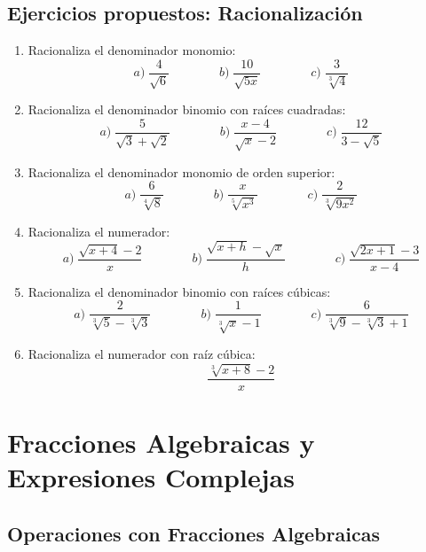 \documentclass[12pt, letterpaper]{article}
\begin{document}
\subsection{Ejercicios propuestos: Racionalización}

\begin{enumerate}[resume=ejercicios, leftmargin=*]
      \item \facil{} Racionaliza el denominador monomio:
            $$a)\; \frac{4}{\sqrt{6}} \qquad\qquad b)\; \frac{10}{\sqrt{5x}} \qquad\qquad c)\; \frac{3}{\sqrt[3]{4}}$$

      \item \medio{} Racionaliza el denominador binomio con raíces cuadradas:
            $$a)\; \frac{5}{\sqrt{3} + \sqrt{2}} \qquad\qquad b)\; \frac{x - 4}{\sqrt{x} - 2} \qquad\qquad c)\; \frac{12}{3 - \sqrt{5}}$$

      \item \medio{} Racionaliza el denominador monomio de orden superior:
            $$a)\; \frac{6}{\sqrt[4]{8}} \qquad\qquad b)\; \frac{x}{\sqrt[5]{x^3}} \qquad\qquad c)\; \frac{2}{\sqrt[3]{9x^2}}$$

      \item \medio{} Racionaliza el numerador:
            $$a)\; \frac{\sqrt{x + 4} - 2}{x} \qquad\qquad b)\; \frac{\sqrt{x + h} - \sqrt{x}}{h} \qquad\qquad c)\; \frac{\sqrt{2x + 1} - 3}{x - 4}$$

      \item \dificil{} Racionaliza el denominador binomio con raíces cúbicas:
            $$a)\; \frac{2}{\sqrt[3]{5} - \sqrt[3]{3}} \qquad\qquad b)\; \frac{1}{\sqrt[3]{x} - 1} \qquad\qquad c)\; \frac{6}{\sqrt[3]{9} - \sqrt[3]{3} + 1}$$

      \item \dificil{} Racionaliza el numerador con raíz cúbica:
            $$\frac{\sqrt[3]{x + 8} - 2}{x}$$
\end{enumerate}

\section{Fracciones Algebraicas y Expresiones Complejas}

\subsection{Operaciones con Fracciones Algebraicas}
\end{document}
